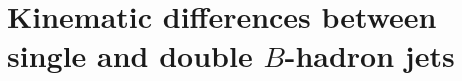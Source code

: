 



\section{Kinematic differences between single and double $B$-hadron jets}\label{sec:gbbKine} %



